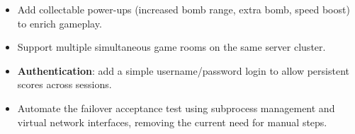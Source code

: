 \documentclass{scrartcl}
\begin{document}
\begin{itemize}
    \item Add collectable power-ups (increased bomb range, extra bomb, speed boost) to enrich gameplay.
    \item Support multiple simultaneous game rooms on the same server cluster.
    \item \textbf{Authentication}: add a simple username/password login to allow persistent scores across sessions.
    \item Automate the failover acceptance test using subprocess management and virtual network interfaces, removing the current need for manual steps.
\end{itemize}
\end{document}
